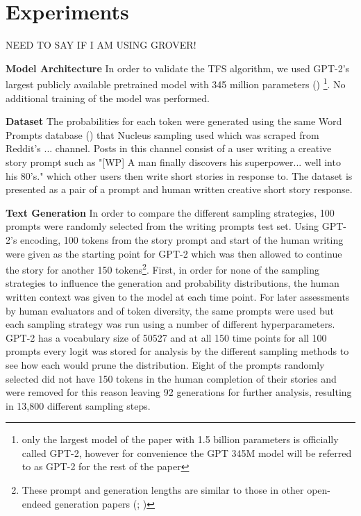 \documentclass{article}
\begin{document}
\section{Experiments}

NEED TO SAY IF I AM USING GROVER!

\textbf{Model Architecture} In order to validate the TFS algorithm, we used GPT-2's largest publicly available pretrained model with 345 million parameters (\cite{radford2019language}) \footnote{only the largest model of the \cite{radford2019language} paper with 1.5 billion parameters is officially called GPT-2, however for convenience the GPT 345M model will be referred to as GPT-2 for the rest of the paper}. No additional training of the model was performed.  

\textbf{Dataset} The probabilities for each token were generated using the same Word Prompts database (\cite{TopKandWritingPrompts}) that Nucleus sampling used which was scraped from Reddit's ... channel. Posts in this channel consist of a user writing a creative story prompt such as "[WP] A man finally discovers his superpower... well into his 80's." which other users then write short stories in response to. The dataset is presented as a pair of a prompt and human written creative short story response. 

\textbf{Text Generation} In order to compare the different sampling strategies, 100 prompts were randomly selected from the writing prompts test set. Using GPT-2's encoding, 100 tokens from the story prompt and start of the human writing were given as the starting point for GPT-2 which was then allowed to continue the story for another 150 tokens\footnote{These prompt and generation lengths are similar to those in other open-endeed generation papers (\cite{TopKandWritingPrompts}; \cite{Grover})}. First, in order for none of the sampling strategies to influence the generation and probability distributions, the human written context was given to the model at each time point. For later assessments by human evaluators and of token diversity, the same prompts were used but each sampling strategy was run using a number of different hyperparameters. GPT-2 has a vocabulary size of 50527 and at all 150 time points for all 100 prompts every logit was stored for analysis by the different sampling methods to see how each would prune the distribution. Eight of the prompts randomly selected did not have 150 tokens in the human completion of their stories and were removed for this reason leaving 92 generations for further analysis, resulting in 13,800 different sampling steps.
\end{document}
